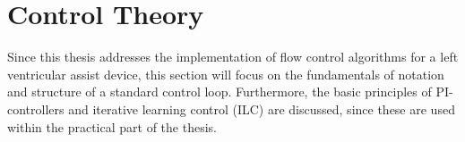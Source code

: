 
\chapter{Control Theory}
Since this thesis addresses the implementation of flow control algorithms for a left ventricular assist device, this section will focus on the fundamentals of notation and structure of a standard control loop. Furthermore, the basic principles of PI-controllers and  iterative learning control (ILC) are discussed, since these are used within the practical part of the thesis.
